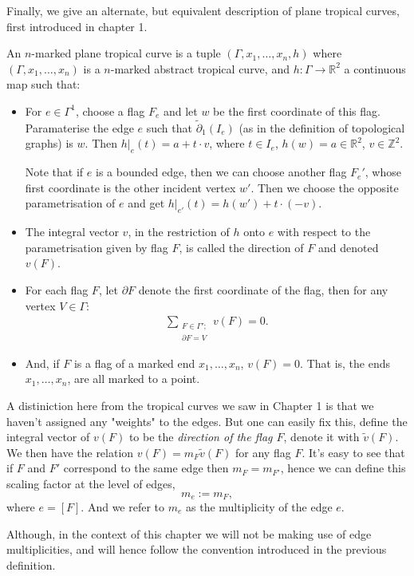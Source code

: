 Finally, we give an alternate, but equivalent description of plane tropical curves, first introduced in chapter 1.
\begin{definition}
    An $n$-marked plane tropical curve is a tuple $(\Gamma, x_{1}, \dots, x_{n}, h)$ where $(\Gamma, x_{1}, \dots, x_{n})$ is a $n$-marked abstract tropical curve, and $h:\Gamma \to \mathbb{R}^{2}$ a continuous map such that:
    \begin{itemize}
        \item For $e \in \Gamma^{1}$, choose a flag $F_{e}$ and let $w$ be the first coordinate of this flag. Paramaterise the edge $e$ such that $\tilde\partial_{1}(I_{e})$ (as in the definition of topological graphs) is $w$.
            Then $h|_{e}(t)= a + t\cdot v$, where $t \in I_{e}$, $h(w) = a\in \mathbb{R}^{2}$, $v \in \mathbb{Z}^{2}$. 
            \par Note that if $e$ is a bounded edge, then we can choose another flag $F_{e}'$, whose first coordinate is the other incident vertex $w'$.
            Then we choose the opposite parametrisation of ${e}$ and get $h|_{e'}(t) = h(w')+ t \cdot (-v)$.
        \item The integral vector $v$, in the restriction of $h$ onto $e$ with respect to the parametrisation given by flag $F$, is called the direction of $F$ and denoted $v(F)$.
                    \item For each flag $F$, let $\partial F$ denote the first coordinate of the flag, then for any vertex $V \in \Gamma$:
            \begin{align*}
                \sum_{\substack{F \in \Gamma'; \\ \partial F  = V}} v(F) = 0.
            \end{align*}
        \item And, if $F$ is a flag of a marked end $x_{1},\dots, x_{n}$, $v(F) = 0$.
            That is, the ends $x_{1}, \dots, x_{n}$, are all marked to a point.
    \end{itemize}
\end{definition}

\begin{remark}
    A distiniction here from the tropical curves we saw in Chapter 1 is that we haven't assigned any "weights" to the edges.
    But one can easily fix this, define the integral vector of $v(F)$ to be the \textit{direction of the flag $F$}, denote it with $\tilde v (F)$.
    We then have the relation $v(F) = m_{F}\tilde v(F)$ for any flag $F$.
            It's easy to see that if $F$ and $F'$ correspond to the same edge then $m_{F} = m_{F'}$, hence we can define this scaling factor at the level of edges, 
            \[
                m_{e}:= m_{F},
            \]
            where $e = [F]$. And we refer to $m_{e}$ as the multiplicity of the edge $e$.
            \par Although, in the context of this chapter we will not be making use of edge multiplicities, and will hence follow the convention introduced in the previous definition.
\end{remark}

